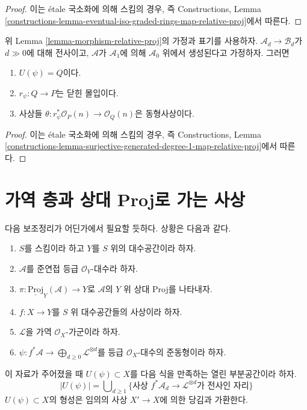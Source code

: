 \begin{proof}
이는 \'etale 국소화에 의해 스킴의 경우, 즉 Constructions, Lemma
\ref{constructions-lemma-eventual-iso-graded-rings-map-relative-proj}에서
따른다.
\end{proof}

\begin{lemma}
\label{lemma-surjective-generated-degree-1-map-relative-proj}
위 Lemma \ref{lemma-morphism-relative-proj}의 가정과 표기를 사용하자.
$\mathcal{A}_d \to \mathcal{B}_d$가 $d \gg 0$에 대해 전사이고,
$\mathcal{A}$가 $\mathcal{A}_1$에 의해 $\mathcal{A}_0$ 위에서
생성된다고 가정하자. 그러면
\begin{enumerate}
\item $U(\psi) = Q$이다.
\item $r_\psi : Q \to P$는 닫힌 몰입이다.
\item 사상들 $\theta : r_\psi^*\mathcal{O}_P(n) \to \mathcal{O}_Q(n)$은
동형사상이다.
\end{enumerate}
\end{lemma}

\begin{proof}
이는 \'etale 국소화에 의해 스킴의 경우, 즉 Constructions, Lemma
\ref{constructions-lemma-surjective-generated-degree-1-map-relative-proj}에서
따른다.
\end{proof}

\section{가역 층과 상대 Proj로 가는 사상}
\label{section-invertible-relative-proj}

\noindent
다음 보조정리가 어딘가에서 필요할 듯하다. 상황은 다음과 같다.
\begin{enumerate}
\item $S$를 스킴이라 하고 $Y$를 $S$ 위의 대수공간이라 하자.
\item $\mathcal{A}$를 준연접 등급 $\mathcal{O}_Y$-대수라 하자.
\item $\pi : \underline{\text{Proj}}_Y(\mathcal{A}) \to Y$로
$\mathcal{A}$의 $Y$ 위 상대 Proj를 나타내자.
\item $f : X \to Y$를 $S$ 위 대수공간들의 사상이라 하자.
\item $\mathcal{L}$을 가역 $\mathcal{O}_X$-가군이라 하자.
\item
$\psi : f^*\mathcal{A} \to \bigoplus_{d \geq 0} \mathcal{L}^{\otimes d}$를
등급 $\mathcal{O}_X$-대수의 준동형이라 하자.
\end{enumerate}
이 자료가 주어졌을 때 $U(\psi) \subset X$를 다음 식을 만족하는 열린
부분공간이라 하자.
$$
|U(\psi)| = \bigcup\nolimits_{d \geq 1}
\{\text{사상 }f^*\mathcal{A}_d \to \mathcal{L}^{\otimes d}
\text{가 전사인 자리}\}
$$
$U(\psi) \subset X$의 형성은 임의의 사상 $X' \to X$에 의한 당김과
가환한다.

